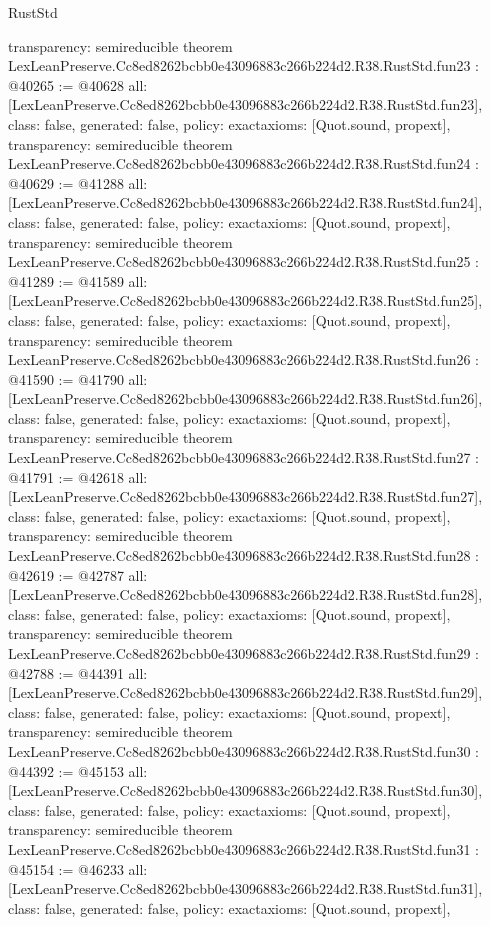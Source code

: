 \begin{lexlean}{RustStd}
\begin{coremodule}
{  transparency: semireducible
}
theorem LexLeanPreserve.Cc8ed8262bcbb0e43096883c266b224d2.R38.RustStd.fun23 : @40265 := @40628 {
  all: [LexLeanPreserve.Cc8ed8262bcbb0e43096883c266b224d2.R38.RustStd.fun23],
  class: false,
  generated: false,
  policy: exact{axioms: [Quot.sound, propext]},
  transparency: semireducible
}
theorem LexLeanPreserve.Cc8ed8262bcbb0e43096883c266b224d2.R38.RustStd.fun24 : @40629 := @41288 {
  all: [LexLeanPreserve.Cc8ed8262bcbb0e43096883c266b224d2.R38.RustStd.fun24],
  class: false,
  generated: false,
  policy: exact{axioms: [Quot.sound, propext]},
  transparency: semireducible
}
theorem LexLeanPreserve.Cc8ed8262bcbb0e43096883c266b224d2.R38.RustStd.fun25 : @41289 := @41589 {
  all: [LexLeanPreserve.Cc8ed8262bcbb0e43096883c266b224d2.R38.RustStd.fun25],
  class: false,
  generated: false,
  policy: exact{axioms: [Quot.sound, propext]},
  transparency: semireducible
}
theorem LexLeanPreserve.Cc8ed8262bcbb0e43096883c266b224d2.R38.RustStd.fun26 : @41590 := @41790 {
  all: [LexLeanPreserve.Cc8ed8262bcbb0e43096883c266b224d2.R38.RustStd.fun26],
  class: false,
  generated: false,
  policy: exact{axioms: [Quot.sound, propext]},
  transparency: semireducible
}
theorem LexLeanPreserve.Cc8ed8262bcbb0e43096883c266b224d2.R38.RustStd.fun27 : @41791 := @42618 {
  all: [LexLeanPreserve.Cc8ed8262bcbb0e43096883c266b224d2.R38.RustStd.fun27],
  class: false,
  generated: false,
  policy: exact{axioms: [Quot.sound, propext]},
  transparency: semireducible
}
theorem LexLeanPreserve.Cc8ed8262bcbb0e43096883c266b224d2.R38.RustStd.fun28 : @42619 := @42787 {
  all: [LexLeanPreserve.Cc8ed8262bcbb0e43096883c266b224d2.R38.RustStd.fun28],
  class: false,
  generated: false,
  policy: exact{axioms: [Quot.sound, propext]},
  transparency: semireducible
}
theorem LexLeanPreserve.Cc8ed8262bcbb0e43096883c266b224d2.R38.RustStd.fun29 : @42788 := @44391 {
  all: [LexLeanPreserve.Cc8ed8262bcbb0e43096883c266b224d2.R38.RustStd.fun29],
  class: false,
  generated: false,
  policy: exact{axioms: [Quot.sound, propext]},
  transparency: semireducible
}
theorem LexLeanPreserve.Cc8ed8262bcbb0e43096883c266b224d2.R38.RustStd.fun30 : @44392 := @45153 {
  all: [LexLeanPreserve.Cc8ed8262bcbb0e43096883c266b224d2.R38.RustStd.fun30],
  class: false,
  generated: false,
  policy: exact{axioms: [Quot.sound, propext]},
  transparency: semireducible
}
theorem LexLeanPreserve.Cc8ed8262bcbb0e43096883c266b224d2.R38.RustStd.fun31 : @45154 := @46233 {
  all: [LexLeanPreserve.Cc8ed8262bcbb0e43096883c266b224d2.R38.RustStd.fun31],
  class: false,
  generated: false,
  policy: exact{axioms: [Quot.sound, propext]},
}
\end{coremodule}
\end{lexlean}
